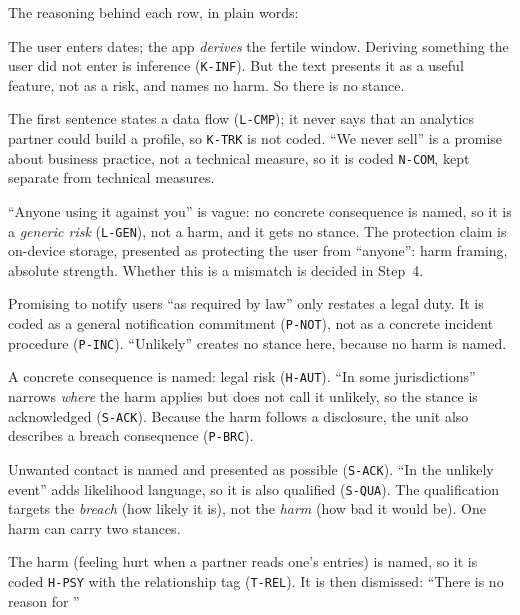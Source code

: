 \noindent The reasoning behind each row, in plain words:

\begin{description}[leftmargin=0pt,itemsep=3pt]
  \item[U1.] The user enters dates; the app \emph{derives} the fertile window.
    Deriving something the user did not enter is inference (\texttt{K-INF}).
    But the text presents it as a useful feature, not as a risk, and names no
    harm. So there is no stance.
  \item[U2.] The first sentence states a data flow (\texttt{L-CMP}); it never
    says that an analytics partner could build a profile, so \texttt{K-TRK} is
    not coded.
    \enquote{We never sell} is a promise about business practice, not a
    technical measure, so it is coded \texttt{N-COM}, kept separate from
    technical measures.
  \item[U3.] \enquote{Anyone using it against you} is vague: no concrete
    consequence is named, so it is a \emph{generic risk} (\texttt{L-GEN}), not
    a harm, and it gets no stance. The protection claim is on-device storage,
    presented as protecting the user from \enquote{anyone}: harm framing,
    absolute strength. Whether this is a mismatch is decided in Step~4.
  \item[U4.] Promising to notify users \enquote{as required by law} only
    restates a legal duty. It is coded as a general notification commitment
    (\texttt{P-NOT}), not as a concrete incident procedure (\texttt{P-INC}).
    \enquote{Unlikely} creates no stance here, because no harm is named.
  \item[U5.] A concrete consequence is named: legal risk (\texttt{H-AUT}).
    \enquote{In some jurisdictions} narrows \emph{where} the harm applies but
    does not call it unlikely, so the stance is acknowledged (\texttt{S-ACK}).
    Because the harm follows a disclosure, the unit also describes a breach
    consequence (\texttt{P-BRC}).
  \item[U6.] Unwanted contact is named and presented as possible
    (\texttt{S-ACK}). \enquote{In the unlikely event} adds likelihood language,
    so it is also qualified (\texttt{S-QUA}). The qualification targets the
    \emph{breach} (how likely it is), not the \emph{harm} (how bad it would
    be). One harm can carry two stances.
  \item[U7.] The harm (feeling hurt when a partner reads one's entries) is
    named, so it is coded \texttt{H-PSY} with the relationship tag
    (\texttt{T-REL}). It is then dismissed: \enquote{There is no reason for
}
\end{description}

